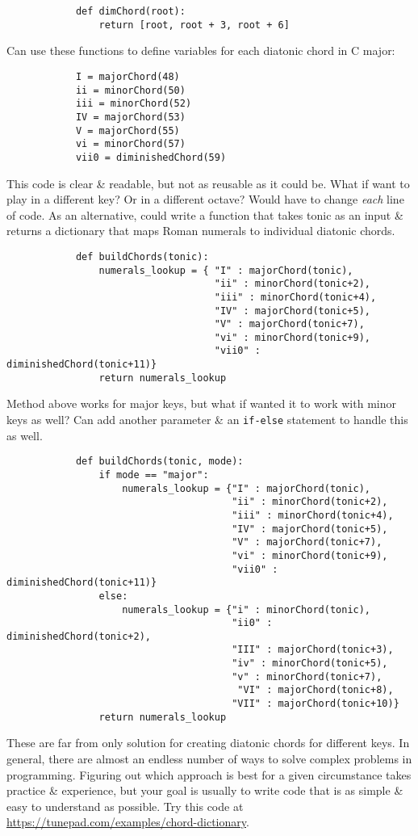 \documentclass{article}
\begin{document}
\begin{itemize}
\begin{itemize}
\begin{verbatim}
			def dimChord(root):
			    return [root, root + 3, root + 6]
		\end{verbatim}
		Can use these functions to define variables for each diatonic chord in C major:
		\begin{verbatim}
			I = majorChord(48)
			ii = minorChord(50)
			iii = minorChord(52)
			IV = majorChord(53)
			V = majorChord(55)
			vi = minorChord(57)
			vii0 = diminishedChord(59)
		\end{verbatim}
		This code is clear \& readable, but not as reusable as it could be. What if want to play in a different key? Or in a different octave? Would have to change {\it each} line of code. As an alternative, could write a function that takes tonic as an input \& returns a dictionary that maps Roman numerals to individual diatonic chords.
		\begin{verbatim}
			def buildChords(tonic):
			    numerals_lookup = { "I" : majorChord(tonic),
				                    "ii" : minorChord(tonic+2),
				                    "iii" : minorChord(tonic+4),
				                    "IV" : majorChord(tonic+5),
				                    "V" : majorChord(tonic+7),
				                    "vi" : minorChord(tonic+9),
				                    "vii0" : diminishedChord(tonic+11)}
		        return numerals_lookup
		\end{verbatim}
		Method above works for major keys, but what if wanted it to work with minor keys as well? Can add another parameter \& an {\tt if-else} statement to handle this as well.
		\begin{verbatim}
			def buildChords(tonic, mode):
			    if mode == "major":
			        numerals_lookup = {"I" : majorChord(tonic),
			                           "ii" : minorChord(tonic+2),
			                           "iii" : minorChord(tonic+4),
			                           "IV" : majorChord(tonic+5),
			                           "V" : majorChord(tonic+7),
			                           "vi" : minorChord(tonic+9),
			                           "vii0" : diminishedChord(tonic+11)}
			    else:
			        numerals_lookup = {"i" : minorChord(tonic),
			                           "ii0" : diminishedChord(tonic+2),
			                           "III" : majorChord(tonic+3),
			                           "iv" : minorChord(tonic+5),
			                           "v" : minorChord(tonic+7),
			                            "VI" : majorChord(tonic+8),
			                           "VII" : majorChord(tonic+10)}
			    return numerals_lookup			    
		\end{verbatim}
		These are far from only solution for creating diatonic chords for different keys. In general, there are almost an endless number of ways to solve complex problems in programming. Figuring out which approach is best for a given circumstance takes practice \& experience, but your goal is usually to write code that is as simple \& easy to understand as possible. Try this code at \url{https://tunepad.com/examples/chord-dictionary}.

\end{itemize}
\end{itemize}
\end{document}
